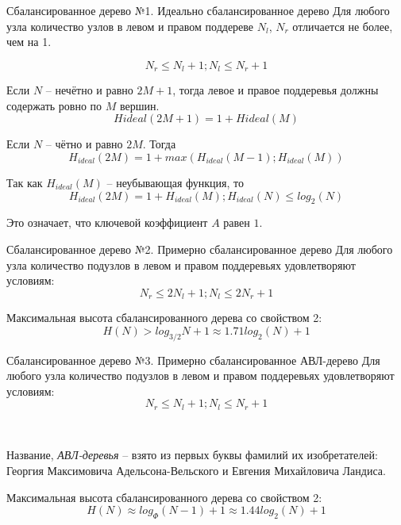 \documentclass{beamer}
\begin{document}
\begin{frame}[fragile]{Сбалансированное дерево №1. Идеально сбалансированное дерево}
	Для любого узла количество узлов в левом и правом поддереве $N_l$, $N_r$ отличается не более, чем на 1. 

	\[N_r \leq N_l + 1; N_l \leq N_r + 1\]

	Если $N$ -- нечётно и равно $2M + 1$, тогда левое и правое поддеревья должны содержать ровно по $M$ вершин.
	\[Hideal(2M + 1) = 1 + Hideal(M)\]
	
	Если $N$ -- чётно и равно $2M$. Тогда 
	\[H_{ideal}(2M) = 1 + max(H_{ideal}(M - 1); H_{ideal}(M))\]

	Так как $H_{ideal}(M)$ -- неубывающая функция, то 
	\[H_{ideal}(2M) = 1 + H_{ideal}(M); H_{ideal}(N) \leq log_2(N)\]
	
	Это означает, что ключевой коэффициент $A$ равен $1$.
\end{frame}

\begin{frame}[fragile]{Сбалансированное дерево №2. Примерно сбалансированное дерево}
	Для любого узла количество подузлов в левом и правом поддеревьях удовлетворяют условиям:
	\[N_r \leq 2N_l + 1; N_l \leq 2N_r + 1\]

	Максимальная высота сбалансированного дерева со свойством 2:
	\[H(N) > log_{3/2}N+1 \approx 1.71 log_2(N)+ 1\]
\end{frame}

\begin{frame}[fragile]{Сбалансированное дерево №3. Примерно сбалансированное АВЛ-дерево}
	Для любого узла количество подузлов в левом и правом поддеревьях удовлетворяют условиям:
	\[N_r \leq N_l+1; N_l \leq N_r+1\]

	~
	
	Название, \textit{АВЛ-деревья} -- взято из первых буквы фамилий их изобретателей: Георгия Максимовича Адельсона-Вельского и Евгения Михайловича Ландиса.

	Максимальная высота сбалансированного дерева со свойством 2:
	\[H(N) \approx log_{\Phi}(N-1)+ 1 \approx 1.44 log_2(N)+1 \]
\end{frame}
\end{document}
